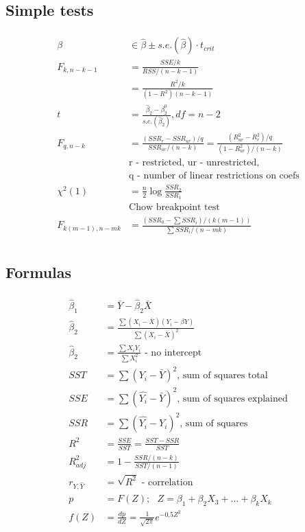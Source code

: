 \documentclass{article}
\def\Eq#1{{\begin{gather}\begin{split} #1 \end{split}\end{gather}}}
\begin{document}
\begin{multicols}{2}

\subsection*{Simple tests}

\Eq{
    \beta &\in \hat{\beta} \pm s.e.(\hat{\beta}) \cdot t_{crit} \\
    F_{k, n - k - 1} &= \frac{SSE/k}{RSS / (n - k - 1)} \\
    &= \frac{R^2 / k}{(1 - R^2)(n - k - 1)} \\
    t &= \frac{\hat{\beta}_2 - \beta^0_2}{s.e.(\hat{\beta}_2)}, df = n-2 \\
    F_{q,n-k} &= \frac{(SSR_r - SSR_{ur}) / q}{SSR_{ur} / (n-k)} = \frac{(R^2_{ur} - R_r^2) / q}{(1 - R^2_{ur})/(n - k)} \\
    &\text{r - restricted, ur - unrestricted, } \\
    &\text{q - number of linear restrictions on coefs} \\
    \chi^2(1) &= \frac{n}{2}\log\frac{SSR_2}{SSR_1} \\
    &\text{Chow breakpoint test} \\
    F_{k(m-1),n-m k} &= \frac{(SSR_0 - \sum SSR_i) / (k(m - 1))}{\sum SSR_i / (n - m k)} \\
}

\subsection*{Formulas}

\Eq{
    \hat{\beta}_1 &= \bar{Y} - \hat{\beta}_2 \bar{X} \\
    \hat{\beta}_2 &= \frac{\sum (X_i - \bar{X})(Y_i - \beta{Y})}{\sum (X_i - \bar{X})^2} \\
    \hat{\beta}_2 &= \frac{\sum X_i Y_i}{\sum X_i^2} \text{ - no intercept} \\
    SST &= \sum (Y_i - \bar{Y})^2 \text{, sum of squares total} \\
    SSE &= \sum (\hat{Y_i} - \bar{Y})^2 \text{, sum of squares explained} \\
    SSR &= \sum (\hat{Y_i} - Y_i)^2 \text{, sum of squares } \\
    R^2 &= \frac{SSE}{SST} = \frac{SST - SSR}{SST} \\
    R^2_{adj} &= 1 - \frac{SSR/(n - k)}{SST / (n - 1)} \\
    r_{Y,\hat{Y}} &= \sqrt{R^2} \text{ - correlation} \\
    p &= F(Z);\text{  } Z = \beta_1 + \beta_2 X_3 + \dots + \beta_k X_k \\
    f(Z) &= \frac{dp}{dZ} = \frac{1}{\sqrt{2 \pi}}e^{-0.5Z^2}
}

\end{multicols}
\end{document}
